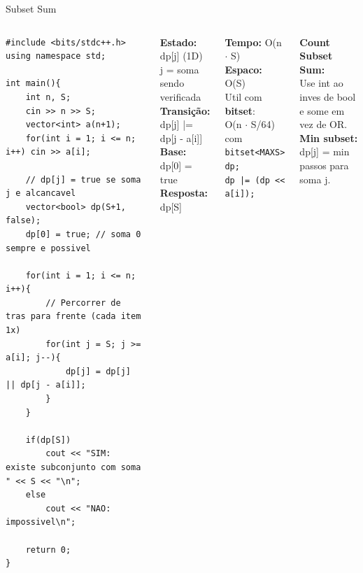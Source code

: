 \documentclass[aspectratio=169,10pt]{beamer}
\begin{document}
\begin{frame}[fragile,shrink=3]{Subset Sum}
  \begin{columns}[t]
      \begin{tcolorbox}[caixaCodigo]
        \begin{lstlisting}[style=cppstyle]
#include <bits/stdc++.h>
using namespace std;

int main(){
    int n, S;
    cin >> n >> S;
    vector<int> a(n+1);
    for(int i = 1; i <= n; i++) cin >> a[i];

    // dp[j] = true se soma j e alcancavel
    vector<bool> dp(S+1, false);
    dp[0] = true; // soma 0 sempre e possivel

    for(int i = 1; i <= n; i++){
        // Percorrer de tras para frente (cada item 1x)
        for(int j = S; j >= a[i]; j--){
            dp[j] = dp[j] || dp[j - a[i]];
        }
    }

    if(dp[S])
        cout << "SIM: existe subconjunto com soma " << S << "\n";
    else
        cout << "NAO: impossivel\n";

    return 0;
}
        \end{lstlisting}
      \end{tcolorbox}
      \begin{tcolorbox}[caixaDP,title={Estrutura}]
        \footnotesize
        \textbf{Estado:} dp[j] (1D)\\
        j = soma sendo verificada\\[4pt]
        \textbf{Transição:}\\
        dp[j] |= dp[j - a[i]]\\[4pt]
        \textbf{Base:} dp[0] = true\\[4pt]
        \textbf{Resposta:} dp[S]
      \end{tcolorbox}
      \vspace{0.08cm}
      \begin{tcolorbox}[caixaAzul,title={Complexidade}]
        \footnotesize
        \textbf{Tempo:} O(n $\cdot$ S)\\
        \textbf{Espaco:} O(S)\\[3pt]
        Util com \textbf{bitset}:\\
        O(n $\cdot$ S/64) com\\
        \texttt{bitset<MAXS> dp;}\\
        \texttt{dp |= (dp << a[i]);}
      \end{tcolorbox}
      \vspace{0.08cm}
      \begin{tcolorbox}[caixaAmarelo,title={Variação}]
        \footnotesize
        \textbf{Count Subset Sum:}\\
        Use int ao inves de bool\\
        e some em vez de OR.\\[2pt]
        \textbf{Min subset:}\\
        dp[j] = min passos para soma j.
      \end{tcolorbox}
  \end{columns}
\end{frame}
\end{document}
